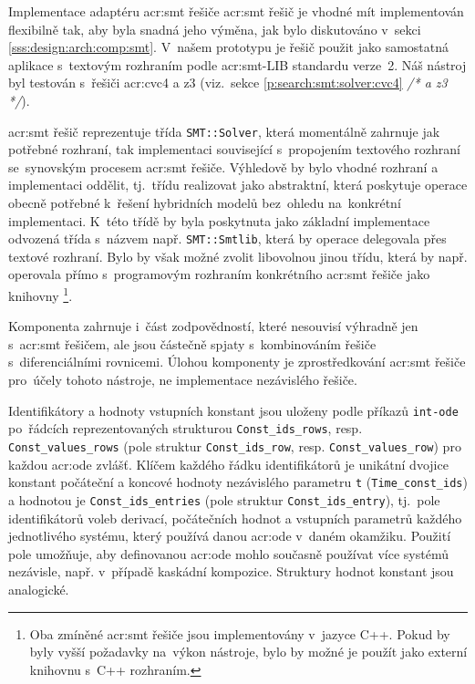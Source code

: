 \documentclass[thesis=M,czech]{FITthesis}[2012/06/26]
\newcommand{\acrlabel}[1]{acr:#1}
\newcommand{\acr}[1]{\acrshort{\acrlabel{#1}}}
\newcommand{\cmt}[1]{\textit{/* #1 */}}
\newcommand{\id}[1]{\texttt{#1}}
\newcommand{\rf}[1]{\ref{#1}}
\begin{document}
\begin{section}{Implementace adaptéru \acr{smt} řešiče}\label{s:impl:smt}
\acr{smt} řešič je vhodné mít implementován flexibilně tak,
aby byla snadná jeho výměna, jak bylo diskutováno
v~sekci \rf{sss:design:arch:comp:smt}.
V~našem prototypu je řešič použit jako samostatná aplikace
s~textovým rozhraním podle \acr{smt}-LIB standardu verze~2.
Náš nástroj byl testován s~řešiči \acr{cvc}4 a z3
(viz.~sekce \rf{p:search:smt:solver:cvc4} \cmt{a z3}).

\acr{smt} řešič reprezentuje třída \id{SMT::\-Solver},
která momentálně zahrnuje jak potřebné rozhraní, tak implementaci
související s~propojením textového rozhraní
se~synovským procesem \acr{smt} řešiče.
Výhledově by bylo vhodné rozhraní a implementaci oddělit,
tj.~třídu realizovat jako abstraktní,
která poskytuje operace obecně potřebné
k~řešení hybridních modelů
bez~ohledu na~konkrétní implementaci.
K~této třídě by byla poskytnuta
jako základní implementace odvozená třída
s~názvem např. \id{SMT::\-Smtlib},
která by operace delegovala přes textové rozhraní.
Bylo by však možné zvolit libovolnou jinou třídu,
která by např. operovala přímo s~programovým
rozhraním konkrétního \acr{smt} řešiče jako knihovny%
\footnote{Oba zmíněné \acr{smt} řešiče jsou implementovány v~jazyce C++.
Pokud by byly vyšší požadavky na~výkon nástroje,
bylo by možné je použít jako externí knihovnu s~C++ rozhraním.}.

Komponenta zahrnuje i~část zodpovědností,
které nesouvisí výhradně jen s~\acr{smt} řešičem,
ale jsou částečně spjaty s~kombinováním
řešiče s~diferenciálními rovnicemi.
Úlohou komponenty je zprostředkování \acr{smt} řešiče
pro~účely tohoto nástroje,
ne implementace nezávislého řešiče.


\begin{paragraph}{Identifikátory a hodnoty}\label{p:impl:smt:consts}
vstupních konstant jsou uloženy podle příkazů \id{int\--ode}
po~řádcích reprezentovaných strukturou \id{Const\_\-ids\_\-rows},
resp. \id{Const\_\-values\_\-rows}
(pole struktur \id{Const\_\-ids\_\-row},
resp. \id{Const\_\-values\_\-row})
pro každou \acr{ode} zvlášť.
Klíčem každého řádku identifikátorů je unikátní dvojice konstant
počáteční a koncové hodnoty nezávislého parametru \id{t}
(\id{Time\_\-const\_\-ids})
a hodnotou je \id{Const\_\-ids\_\-entries}
(pole struktur \id{Const\_\-ids\_\-entry}),
tj.~pole identifikátorů voleb derivací, počátečních hodnot
a vstupních parametrů každého jednotlivého systému,
který používá danou \acr{ode} v~daném okamžiku.
Použití pole umožňuje,
aby definovanou \acr{ode}
mohlo současně používat více systémů nezávisle,
např. v~případě kaskádní kompozice.
Struktury hodnot konstant jsou analogické.
\end{paragraph} %


\end{section}
\end{document}
